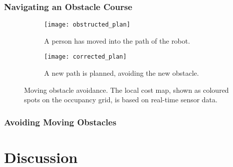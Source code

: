 \subsubsection{Navigating an Obstacle Course}

\begin{figure}
	\centering
	\begin{subfigure}[b]{0.46\textwidth}
		\texttt{[image: obstructed\_plan]}
		\caption{A person has moved into the path of the robot.}
		\label{fig:obstructed_plan}
	\end{subfigure}
	\begin{subfigure}[b]{0.472\textwidth}
		\texttt{[image: corrected\_plan]}
		\caption{A new path is planned, avoiding the new obstacle.}
		\label{fig:corrected_plan}
	\end{subfigure}
    \caption{Moving obstacle avoidance. The local cost map, shown as coloured spots on the occupancy grid, is based on real-time sensor data. }
\end{figure}

\subsubsection{Avoiding Moving Obstacles}






\section{Discussion}